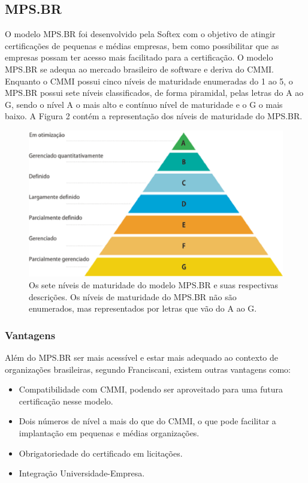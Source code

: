   \subsection{MPS.BR}

  O modelo MPS.BR foi desenvolvido pela Softex com o objetivo de atingir
  certificações de pequenas e médias empresas, bem como possibilitar que
  as empresas possam ter acesso mais facilitado para a certificação.
  O modelo MPS.BR se adequa ao mercado brasileiro de software e deriva do CMMI.
  Enquanto o CMMI possui cinco níveis de maturidade enumeradas do 1 ao 5, o
  MPS.BR possui sete níveis classificados, de forma piramidal,  pelas letras
  do A ao G, sendo o nível A o mais alto e contínuo nível de maturidade e o G
  o mais baixo. A Figura 2 contém a representação dos níveis de maturidade do
  MPS.BR.

  \begin{figure}[!ht]
    \centering
    \includegraphics[width=15cm, keepaspectratio=true]{figuras/maturidade/niveis-mpsbr.eps}
    \caption{Os sete níveis de maturidade do modelo MPS.BR e suas respectivas descrições. Os
              níveis de maturidade do MPS.BR não são enumerados, mas representados por letras
              que vão do A ao G.}
  \end{figure}

    \subsubsection{Vantagens}

    Além do MPS.BR ser mais acessível e estar mais adequado ao contexto de
    organizações brasileiras, segundo Franciscani, existem outras vantagens
    como:

    \begin{itemize}
      \item{Compatibilidade com CMMI, podendo ser aproveitado para uma futura
            certificação nesse modelo.}
      \item{Dois números de nível a mais do que do CMMI, o que pode facilitar a
            implantação em pequenas e médias organizações.}
      \item{Obrigatoriedade do certificado em licitações.}
      \item{Integração Universidade-Empresa.}
    \end{itemize}

